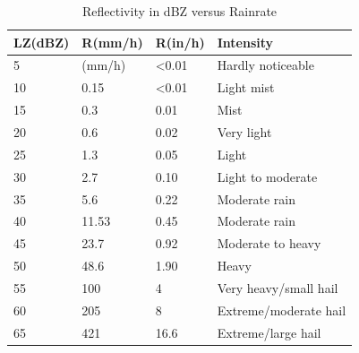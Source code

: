 \documentclass[acmtog, authorversion]{acmart}
\begin{document}
\begin{table}[h]
\caption{Reflectivity in dBZ versus Rainrate}
\begin{tabular}{@{}llll@{}}
\toprule
LZ(dBZ) & R(mm/h) & R(in/h)        & Intensity             \\ \midrule
5       & (mm/h)  & \textless 0.01 & Hardly noticeable     \\
10      & 0.15    & \textless 0.01 & Light mist            \\
15      & 0.3     & 0.01           & Mist                  \\
20      & 0.6     & 0.02           & Very light            \\
25      & 1.3     & 0.05           & Light                 \\
30      & 2.7     & 0.10           & Light to moderate     \\
35      & 5.6     & 0.22           & Moderate rain         \\
40      & 11.53   & 0.45           & Moderate rain         \\
45      & 23.7    & 0.92           & Moderate to heavy     \\
50      & 48.6    & 1.90           & Heavy                 \\
55      & 100     & 4              & Very heavy/small hail \\
60      & 205     & 8              & Extreme/moderate hail \\
65      & 421     & 16.6           & Extreme/large hail    \\ \bottomrule
\end{tabular}
\end{table}
\end{document}
